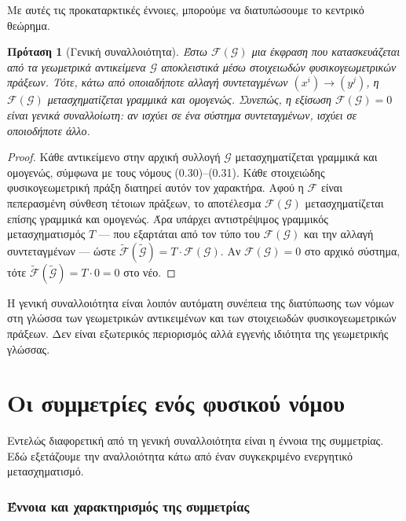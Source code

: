 \documentclass[11pt,a4paper,twoside,openright]{book}
\newtheorem{proposition}[lemma]{Πρόταση}
\begin{document}
Με αυτές τις προκαταρκτικές έννοιες, μπορούμε να διατυπώσουμε το κεντρικό θεώρημα.

\begin{proposition}[Γενική συναλλοιότητα]
\label{prop:general_covariance}
Έστω $\mathcal{F}(\mathcal{G})$ μια έκφραση που κατασκευάζεται από τα γεωμετρικά αντικείμενα $\mathcal{G}$ αποκλειστικά μέσω στοιχειωδών φυσικογεωμετρικών πράξεων. Τότε, κάτω από οποιαδήποτε αλλαγή συντεταγμένων $(x^i) \to (y^j)$, η $\mathcal{F}(\mathcal{G})$ μετασχηματίζεται γραμμικά και ομογενώς. Συνεπώς, η εξίσωση $\mathcal{F}(\mathcal{G}) = 0$ είναι γενικά συναλλοίωτη: αν ισχύει σε ένα σύστημα συντεταγμένων, ισχύει σε οποιοδήποτε άλλο.
\end{proposition}

\begin{proof}
Κάθε αντικείμενο στην αρχική συλλογή $\mathcal{G}$ μετασχηματίζεται γραμμικά και ομογενώς, σύμφωνα με τους νόμους (0.30)–(0.31). Κάθε στοιχειώδης φυσικογεωμετρική πράξη διατηρεί αυτόν τον χαρακτήρα. Αφού η $\mathcal{F}$ είναι πεπερασμένη σύνθεση τέτοιων πράξεων, το αποτέλεσμα $\mathcal{F}(\mathcal{G})$ μετασχηματίζεται επίσης γραμμικά και ομογενώς. Άρα υπάρχει αντιστρέψιμος γραμμικός μετασχηματισμός $T$ — που εξαρτάται από τον τύπο του $\mathcal{F}(\mathcal{G})$ και την αλλαγή συντεταγμένων — ώστε $\tilde{\mathcal{F}}(\tilde{\mathcal{G}}) = T \cdot \mathcal{F}(\mathcal{G})$. Αν $\mathcal{F}(\mathcal{G}) = 0$ στο αρχικό σύστημα, τότε $\tilde{\mathcal{F}}(\tilde{\mathcal{G}}) = T \cdot 0 = 0$ στο νέο.
\end{proof}

Η γενική συναλλοιότητα είναι λοιπόν αυτόματη συνέπεια της διατύπωσης των νόμων στη γλώσσα των γεωμετρικών αντικειμένων και των στοιχειωδών φυσικογεωμετρικών πράξεων. Δεν είναι εξωτερικός περιορισμός αλλά εγγενής ιδιότητα της γεωμετρικής γλώσσας.

\section{Οι συμμετρίες ενός φυσικού νόμου}

Εντελώς διαφορετική από τη γενική συναλλοιότητα είναι η έννοια της συμμετρίας. Εδώ εξετάζουμε την αναλλοιότητα κάτω από έναν συγκεκριμένο ενεργητικό μετασχηματισμό.

\subsubsection{Έννοια και χαρακτηρισμός της συμμετρίας}
\end{document}
